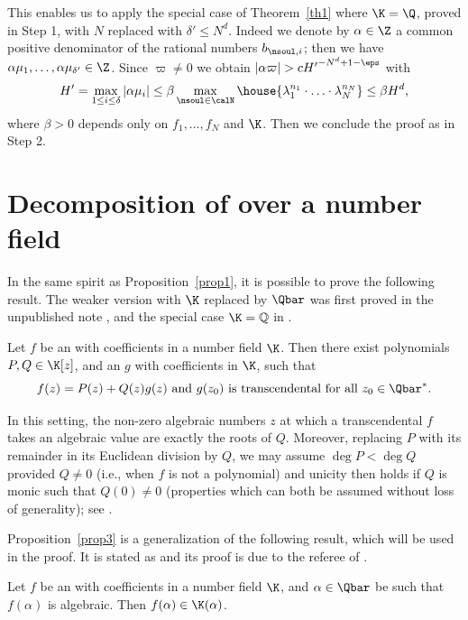 This enables us to apply the special case of Theorem~\ref{th1} where $\K=\Q$, proved in Step 1, with $N$ replaced with $\delta'\leq N^d$.
Indeed we denote by $\alpha\in\Z$ a common positive denominator of the rational numbers $ b_{\nsoul,i} $; then we have
$\alpha\mu_1,\ldots, \alpha\mu_{\delta'}\in\Z$.
Since $\varpi \neq 0$ we obtain $|\alpha \varpi | > c {H'}^{-N^d+1-\eps}$ with
\[
H'=\max_{1\leq i \leq \delta} |\alpha \mu_i| \leq \beta
\max_{\nsoul \in \calN} \house{ \lambda_1^{n_1} \cdot \ldots \cdot \lambda_N^{n_N}} \leq \beta H^d,
\]
where $\beta>0$ depends only on $f_1,\ldots,f_N$ and $\K$. Then we conclude the proof as in Step 2.

\section{Decomposition of \texorpdfstring{\protect\Efunctions}{Ef} over a number field} \label{secdcp}

In the same spirit as Proposition~\ref{prop1}, it is possible to prove the following result. The weaker version with $\K$ replaced by $\Qbar$ was first proved in the unpublished note \cite{ri2016}, and the special case $\K=\mathbb Q$ in \cite{BRS2}.

\begin{prop} \label{prop3}
Let $f$ be an \Efunction with coefficients in a number field $\K$. Then there exist polynomials $P,Q\in\K[z]$, and an \Efunction $g$ with coefficients in $\K$, such that
\[
f(z) = P(z) + Q(z)g(z) \mbox{ and $g(z_0)$ is transcendental for all $z_0\in\Qbar^\ast$.}
\]
\end{prop}

In this setting, the non-zero algebraic numbers $z$ at which a transcendental $f$ takes an algebraic value are exactly the roots of $Q$. Moreover, replacing $P$ with its remainder in its Euclidean division by $Q$, we may assume $\deg P < \deg Q$ provided $Q\neq 0$ (i.e., when $f$ is not a polynomial) and unicity then holds if $Q$ is monic such that $Q(0)\neq 0$ (properties which can both be assumed without loss of generality); see \cite[Prop.\,3.3]{BRS2}.

Proposition~\ref{prop3} is a generalization of the following result, which will be used in the proof. It is stated as \cite[Th.\,4]{ateo} and its proof is due to the referee of \cite{gvalues}.

\begin{lem} \label{lemateo}
Let $f$ be an \Efunction with coefficients in a number field $\K$, and $\alpha\in\Qbar$ be such that $f(\alpha)$ is algebraic. Then $f(\alpha)\in \K(\alpha)$.
\end{lem}

